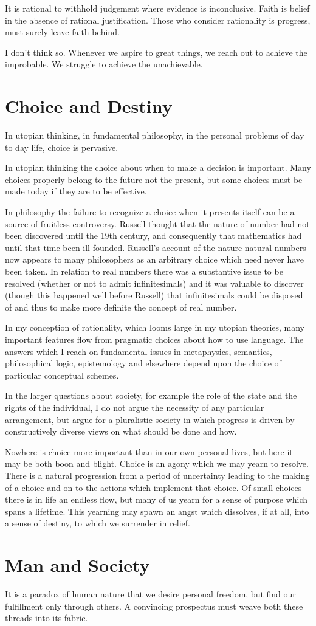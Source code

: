 It is rational to withhold judgement where evidence is inconclusive.
Faith is belief in the absence of rational justification.
Those who consider rationality is progress, must surely leave faith behind.

I don't think so.
Whenever we aspire to great things, we reach out to achieve the improbable.
We struggle to achieve the unachievable.

\section{Choice and Destiny}

In utopian thinking, in fundamental philosophy, in the personal problems of day to day life, choice is pervasive.

In utopian thinking the choice about when to make a decision is important.
Many choices properly belong to the future not the present, but some choices must be made today if they are to be effective.

In philosophy the failure to recognize a choice when it presents itself can be a source of fruitless controversy.
Russell thought that the nature of number had not been discovered until the 19th century, and consequently that mathematics had until that time been ill-founded.
Russell's account of the nature natural numbers now appears to many philosophers as an arbitrary choice which need never have been taken.
In relation to real numbers there was a substantive issue to be resolved (whether or not to admit infinitesimals) and it was valuable to discover (though this happened well before Russell) that infinitesimals could be disposed of and thus to make more definite the concept of real number.

In my conception of rationality, which looms large in my utopian theories, many important features flow from pragmatic choices about how to use language.
The answers which I reach on fundamental issues in metaphysics, semantics, philosophical logic, epistemology and elsewhere depend upon the choice of particular conceptual schemes.

In the larger questions about society, for example the role of the state and the rights of the individual, I do not argue the necessity of any particular arrangement, but argue for a pluralistic society in which progress is driven by constructively diverse views on what should be done and how.

Nowhere is choice more important than in our own personal lives, but here it may be both boon and blight.
Choice is an agony which we may yearn to resolve.
There is a natural progression from a period of uncertainty leading to the making of a choice and on to the actions which implement that choice.
Of small choices there is in life an endless flow, but many of us yearn for a sense of purpose which spans a lifetime.
This yearning may spawn an angst which dissolves, if at all, into a sense of destiny, to which we surrender in relief.

\section{Man and Society}

It is a paradox of human nature that we desire personal freedom, but find our fulfillment only through others.
A convincing prospectus must weave both these threads into its fabric.